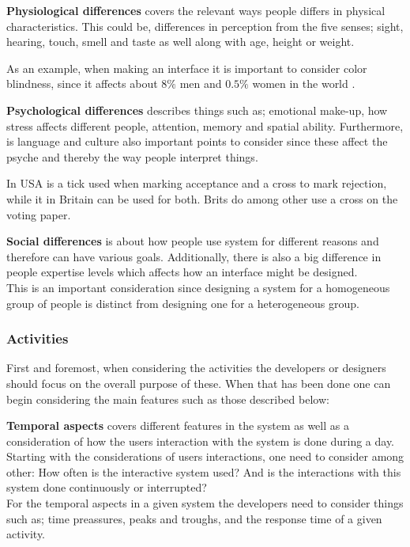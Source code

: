 \textbf{Physiological differences} covers the relevant ways people differs in physical characteristics.
This could be, differences in perception from the five senses; sight, hearing, touch, smell and taste as well along with age, height or weight.
\begin{example} 
As an example, when making an interface it is important to consider color blindness, since it affects about $8\%$ men and $0.5\%$ women in the world \cite{ColourBlind}.
\end{example}

\textbf{Psychological differences} describes things such as; emotional make-up, how stress affects different people, attention, memory and spatial ability.
Furthermore, is language and culture also important points to consider since these affect the psyche and thereby the way people interpret things.
\begin{example}
	In USA is a tick used when marking acceptance and a cross to mark rejection, while it in Britain can be used for both. Brits do among other use a cross on the voting paper.
\end{example}


\textbf{Social differences} is about how people use system for different reasons and therefore can have various goals. 
Additionally, there is also a big difference in people expertise levels which affects how an interface might be designed.
\\\indent
This is an important consideration since designing a system for a homogeneous group of people is  distinct from designing one for a heterogeneous group.

\subsubsection{Activities}
First and foremost, when considering the activities the developers or designers should focus on the overall purpose of these. When that has been done one can begin considering the main features such as those described below:

\textbf{Temporal aspects} covers different features in the system as well as a consideration of how the users interaction with the system is done during a day.
\\\indent
Starting with the considerations of users interactions, one need to consider among other: How often is the interactive system used? And is the interactions with this system done continuously or interrupted?
\\\indent
For the temporal aspects in a given system the developers need to consider things such as; time preassures, peaks and troughs, and the response time of a given activity.


